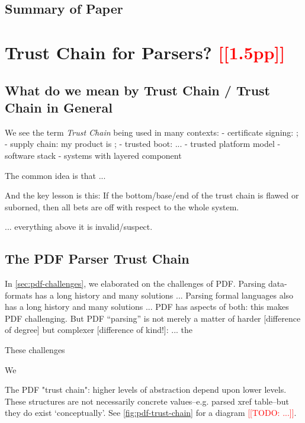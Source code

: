 \documentclass[conference,12pt]{IEEEtran}
\newcommand{\note}[1]{\noteYes{#1}}
\newcommand{\noteYes}[1]{\textcolor{red}{[[#1]]}}
\newcommand{\todo}[1]{\note{TODO: #1}}
\begin{document}
\subsection{Summary of Paper}
      
\section{Trust Chain for Parsers? \note{1.5pp}}
\label{sec:trustchain}

\subsection{What do we mean by Trust Chain / Trust Chain in General}

We see the term \emph{Trust Chain} being used in many contexts:
- certificate signing: ;
- supply chain: my product is ;
- trusted boot: ...
- trusted platform model
- software stack
- systems with layered component

The common idea is that ...

And the key lesson is this: If the bottom/base/end of the trust chain 
is flawed or suborned, then all bets are off with respect to the whole
system.

... everything above it is invalid/suspect.

\subsection{The PDF Parser Trust Chain}

In \cref{sec:pdf-challenges}, we elaborated on the challenges of PDF.
Parsing data-formats has a long history and many solutions ...
Parsing formal languages also has a long history and many solutions ...
PDF has aspects of both: this makes PDF challenging.
But PDF ``parsing'' is not merely a matter of harder [difference of degree]
but complexer [difference of kind!]:
  ... the 

These challenges 

We 

The PDF "trust chain": higher levels of abstraction depend upon lower levels.
These structures are not necessarily concrete values--e.g. parsed xref table--but they do exist `conceptually'.
See \cref{fig:pdf-trust-chain} for a diagram \todo{...}.
\end{document}
